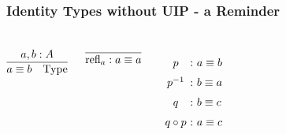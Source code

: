 \documentclass[12pt,pdflatex,hyperref={pdfstartview=Fit,bookmarks=true,bookmarksopen=true,pdfpagemode=None,colorlinks=true,linkcolor=unserblau,urlcolor=unserblau},notes=hide,t,handout]{beamer}
\begin{document}
\begin{frame}

\frametitle{Identity Types without UIP - a Reminder}

\begin{columns}[c] %


\vspace{30pt}

\[
\infer{a \equiv b \quad \mbox{Type}}{a, b : A}
\]

\vspace{30pt}

\[
\infer{\mbox{refl}_a : a \equiv a}{}
\]



\vspace{30pt}

\[
\begin{array}{c@{ \ : \ }l}
\noalign{\medskip}
p & a \equiv b \\
\noalign{\medskip}

p^{-1} & b \equiv a \\
\noalign{\medskip}

q & b \equiv c \\
\noalign{\medskip}

q \circ p & a \equiv c \\
\end{array}
\]

\end{columns}

\end{frame}
\end{document}
